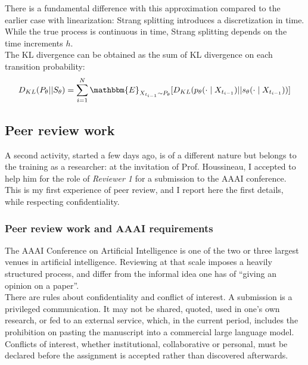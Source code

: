 \documentclass[12pt,a4paper]{article}
\theoremstyle{definition}
\theoremstyle{plain}
\begin{document}
There is a fundamental difference with this approximation compared to the earlier case with linearization: Strang splitting introduces a discretization in time. While the true process is continuous in time, Strang splitting depends on the time increments $h$. \\

The KL divergence can be obtained as the sum of KL divergence on each transition probability:
$$
D_{KL}(P_\theta || S_\theta) = \sum_{i=1}^N \mathbbm{E}_{X_{t_{i-1}} \sim P_\theta} [D_{KL}( p_\theta(\cdot \mid X_{t_{i-1}} ) || s_\theta(\cdot \mid X_{t_{i-1}})) ]
$$



\subsection{Peer review work}
\label{sec:review}

\noindent A second activity, started a few days ago, is of a different nature but
belongs to the training as a researcher: at the invitation of Prof. Houssineau, I accepted to help him for the role of
\emph{Reviewer 1} for a submission to the AAAI conference. This is my first experience of peer
review, and I report here the first details, while respecting confidentiality. \\

\subsubsection{Peer review work and AAAI requirements}
\label{sec:aaai}

\noindent The AAAI Conference on Artificial Intelligence is one of the two or three largest venues in
artificial intelligence. Reviewing at that scale imposes a heavily structured process, and differ from the informal idea one has of
``giving an opinion on a paper''. \\

\noindent There are rules about confidentiality and conflict of interest. A submission is a privileged
communication. It may not be shared, quoted, used in one's own research, or fed to an external
service, which, in the current period, includes the prohibition on pasting the manuscript
into a commercial large language model. Conflicts of interest, whether institutional,
collaborative or personal, must be declared before the assignment is accepted rather than
discovered afterwards. \\
\end{document}
